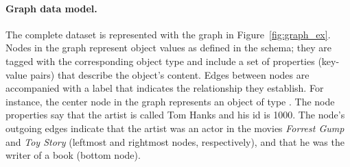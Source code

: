 
\paragraph{Graph data model.}

The complete \goodbois dataset is represented with the graph in
Figure~\ref{fig:graph_ex}. Nodes in the graph represent object values
as defined in the schema; they are tagged with the corresponding
object type and include a set of properties (key-value pairs) that
describe the object's content. Edges between nodes are accompanied with
a label that indicates the relationship they establish. For instance,
the center node in the graph represents an object of type
\artist. The node properties say that the artist is called Tom Hanks and his id is 1000.
The node's outgoing edges indicate that the artist 
was an actor in the movies \emph{Forrest Gump} and \emph{Toy Story}
(leftmost and rightmost nodes, respectively), and
that he was the writer of a book (bottom node).







